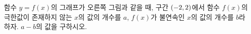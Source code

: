\noindent\begin{minipage}[t]{0.58\linewidth}\vspace{0pt}\raggedright 함수 $y=f(x)$의 그래프가 오른쪽 그림과 같을 때, 구간 $(-2{,}\mkern3mu\mathopen{}2)$에서 함수 $f(x)$의 극한값이 존재하지 않는 $x$의 값의 개수를 $a$, $f(x)$가 불연속인 $x$의 값의 개수를 $b$라 하자. $a-b$의 값을 구하시오.\end{minipage}\hfill\begin{minipage}[t]{0.4\linewidth}\vspace{0pt}\centering \resizebox{\ifdim\width>\linewidth\linewidth\else\width\fi}{!}{}\end{minipage}\par
